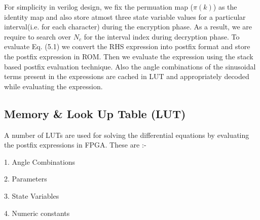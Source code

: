 For simplicity in verilog design, we fix the permuation map ($\pi(k)$) as the identity map and also store atmost three state variable values for a particular interval(i.e. for each character) during the encryption phase. As a result, we are require to search over $N_{c}$ for the interval index during decryption phase. To evaluate Eq. (5.1) we convert the RHS expression into postfix format and store the postfix expression in ROM. Then we evaluate the expression using the stack based postfix evaluation technique. Also the angle combinations of the sinusoidal terms present in the expressions are cached in LUT and appropriately decoded while evaluating the expression.  

\subsection{Memory \& Look Up Table (LUT)}
A number of LUTs are used for solving the differential equations by evaluating the postfix expressions in FPGA. These are :-

1. Angle Combinations

2. Parameters

3. State Variables 

4. Numeric constants

